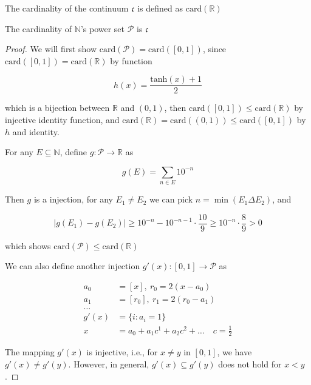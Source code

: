 \begin{definition}
    The cardinality of the continuum $\mathfrak{c}$ is defined as $\mathrm{card}(\mathbb{R})$
\end{definition}

\begin{thm}
    The cardinality of $\mathbb{N}$'s power set $\mathcal{P}$ is $\mathfrak{c}$
\end{thm}

\begin{proof}
    We will first show $\mathrm{card}(\mathcal{P}) = \mathrm{card}([0,1])$, since $\mathrm{card}([0,1]) = \mathrm{card}(\mathbb{R})$ by function

    \[
        h(x) = \frac{\mathrm{tanh}(x) + 1}{2}
    \]

    which is a bijection between $\mathbb{R}$ and $(0,1)$, then $\mathrm{card}([0,1]) \le \mathrm{card}(\mathbb{R})$
    by  injective identity function, and $\mathrm{card}(\mathbb{R}) = \mathrm{card}((0,1)) \le \mathrm{card}([0,1])$ 
    by $h$ and identity.

    For any $E \subseteq \mathbb{N}$, define $g: \mathcal{P} \to \mathbb{R}$ as

    \[
        g(E) = \sum_{n \in E} 10^{-n}
    \]

    Then $g$ is a injection, for any $E_1 \ne E_2$ we can pick $n = \min ( E_1 \Delta E_2 )$, and 
    
    \[
        \left| g(E_1) - g(E_2)\right| \ge 10^{-n} - 10^{-n-1} \cdot \frac{10}{9} \ge 10^{-n} \cdot \frac{8}{9} > 0
    \]

    which shows $\mathrm{card}(\mathcal{P}) \le \mathrm{card}(\mathbb{R})$

    We can also define another injection $g'(x): [0,1] \to \mathcal{P}$ as

    \begin{align*}
        a_0 &= [x],\: r_0 = 2(x - a_0) \\
        a_1 &= [r_0],\: r_1 = 2(r_0 - a_1) \\
        \dots & \\
        g'(x) &= \{ i: a_i = 1 \} \\
        x &= a_0  + a_1 c^{1} + a_2 c^{2} + \dots  \quad c = \frac{1}{2}
    \end{align*}

     The mapping $g'(x)$ is injective, i.e., for $x \neq y$ in $[0,1]$, we have $g'(x) \neq g'(y)$. However, in general, $g'(x) \subseteq g'(y)$ does not hold for $x < y$.

\end{proof}

